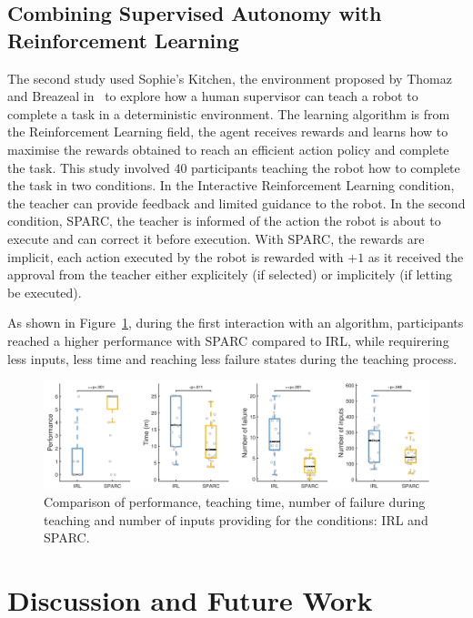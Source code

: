 \documentclass[conference]{IEEEtran}
\begin{document}
\subsection{Combining Supervised Autonomy with Reinforcement Learning}

The second study \cite{senft2017supervised} used Sophie's Kitchen, the
environment proposed by Thomaz and Breazeal in~\cite{thomaz2008teachable} to
explore how a human supervisor can teach a robot to complete a task in a
deterministic environment. The learning algorithm is from the Reinforcement
Learning field, the agent receives rewards and learns how to maximise the
rewards obtained to reach an efficient action policy and complete the task. This
study involved 40 participants teaching the robot how to complete the task in
two conditions. In the Interactive Reinforcement Learning condition, the teacher can
provide feedback and limited guidance to the robot. In the second condition,
SPARC, the teacher is informed of the action the robot is about to execute and
can correct it before execution. With SPARC, the rewards are implicit, each
action executed by the robot is rewarded with $+1$ as it received the approval
from the teacher either explicitely (if selected) or implicitely (if letting be
executed). 

As shown in Figure~\ref{fig:film}, during the first interaction with an
algorithm, participants reached a higher performance with SPARC compared to IRL,
while requirering less inputs, less time and reaching less failure states during
the teaching process.

\begin{figure}
    \centering
    \includegraphics[width=0.9\linewidth]{film.pdf}
    \caption{Comparison of performance, teaching time, number of failure during
    teaching and number of inputs providing for the conditions: IRL and SPARC.}
    \label{fig:film}
\end{figure}

\section{Discussion and Future Work}
\end{document}
